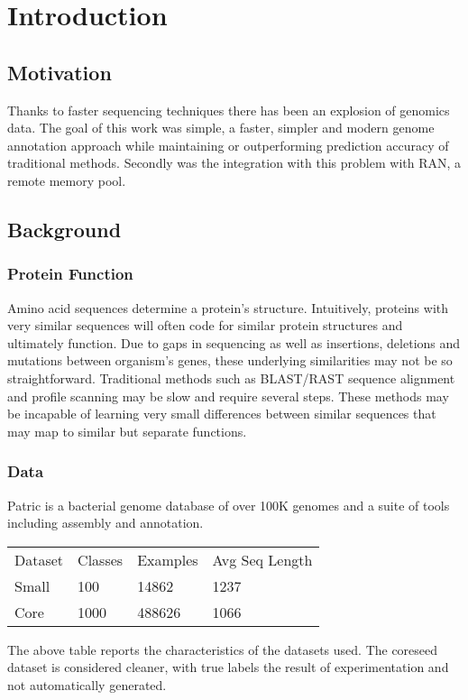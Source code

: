 \section{Introduction}

\subsection{Motivation}
Thanks to faster sequencing techniques there has been an explosion of genomics data. The goal of this work was simple, a faster, simpler and modern genome annotation approach while maintaining or outperforming prediction accuracy of traditional methods. Secondly was the integration with this problem with RAN, a remote memory pool.

\subsection{Background}
\subsubsection{Protein Function}
Amino acid sequences determine a protein’s structure. Intuitively, proteins with very similar sequences will often code for similar protein structures and ultimately function. Due to gaps in sequencing as well as insertions, deletions and mutations between organism's genes, these underlying similarities may not be so straightforward. Traditional methods such as BLAST/RAST sequence alignment and profile scanning may be slow and require several steps. These methods may be incapable of learning very small differences between similar sequences that may map to similar but separate functions.

\subsubsection{Data}
Patric \cite {PATRIC} is a bacterial genome database of over 100K genomes and a suite of tools including assembly and annotation. 

\begin{tabular}{llll}
Dataset & Classes & Examples & Avg Seq Length      \\
Small   & 100     & 14862    & 1237 \\
Core    & 1000    & 488626   & 1066
\end{tabular}

The above table reports the characteristics of the datasets used. The coreseed dataset is considered cleaner, with true labels the result of experimentation and not automatically generated.
